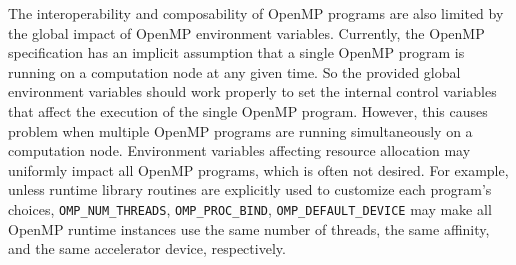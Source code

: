 The interoperability and composability of OpenMP programs are also limited by the global impact of OpenMP environment variables.
Currently, the OpenMP specification has an implicit assumption that a single OpenMP program is running on a computation node at any given time.
So the provided global environment variables should work properly to set the internal control variables that affect the execution
of the single OpenMP program. 
However, this causes problem when multiple OpenMP programs are running simultaneously on a computation node. 
Environment variables affecting resource allocation may uniformly impact all OpenMP programs, which is often not desired.
For example, unless runtime library routines are explicitly used to customize each program's choices, \lstinline{OMP_NUM_THREADS}, \lstinline{OMP_PROC_BIND}, \lstinline{OMP_DEFAULT_DEVICE} may 
make all OpenMP runtime instances use the same number of threads, the same affinity, and the same accelerator device, respectively. 
